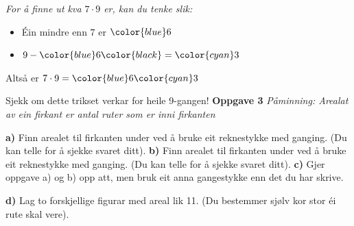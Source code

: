 \vsk
\begin{center}
	\begin{minipage}[c]{0.8\linewidth}
		\itshape
		\textit{For å finne ut kva $7\cdot9  $ er, kan du tenke slik:}
		\begin{itemize}
			\item Éin mindre enn $ 7 $ er $\color{blue} 6 $
			\item $ 9-\color{blue}6\color{black} =\color{cyan}3$
		\end{itemize}
		Altså er $ 7\cdot9=\color{blue}6\color{cyan}3 $
	\end{minipage}
\end{center}\vsk

Sjekk om dette trikset verkar for heile 9-gangen!
\newpage\textbf{Oppgave 3}\bs
\textit{Påminning: \textsl{Arealat} av ein firkant er antal ruter som er inni firkanten}\vsk

\textbf{a)} Finn arealet til firkanten under ved å bruke eit reknestykke med ganging. (Du kan telle for å sjekke svaret ditt).
\textbf{b)} Finn arealet til firkanten under ved å bruke eit reknestykke med ganging. (Du kan telle for å sjekke svaret ditt).
\textbf{c)} Gjer oppgave a) og b) opp att, men bruk eit anna gangestykke enn det du har skrive. \vsk

\textbf{d)} Lag to forskjellige figurar med areal lik 11. (Du bestemmer sjølv kor stor éi rute skal vere).


